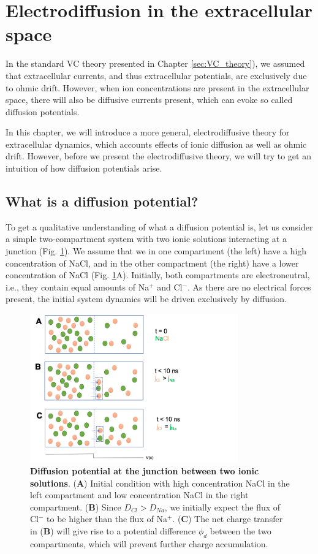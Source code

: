 \section{Electrodiffusion in the extracellular space}
\label{sec:eldiff}
In the standard VC theory presented in Chapter \ref{sec:VC_theory}), we assumed that extracellular currents, and thus extracellular potentials, are exclusively due to ohmic drift. However, when ion concentrations are present in the extracellular space, there will also be diffusive currents present, which can evoke so called diffusion potentials. 

In this chapter, we will introduce a more general, electrodiffusive theory for extracellular dynamics, which accounts effects of ionic diffusion as well as ohmic drift. However, before we present the electrodiffusive theory, we will try to get an intuition of how diffusion potentials arise.

\subsection{What is a diffusion potential?}
To get a qualitative understanding of what a diffusion potential is, let us consider a simple two-compartment system with two ionic solutions interacting at a junction  (Fig. \ref{fig:diffpot}). We assume that we in one compartment (the left) have a high concentration of NaCl, and in the other compartment (the right) have a lower concentration of NaCl (Fig. \ref{fig:diffpot}A). Initially, both compartments are electroneutral, i.e., they contain equal amounts of Na$^+$ and Cl$^-$. As there are no electrical forces present, the initial system dynamics will be driven exclusively by diffusion. 

\begin{figure}[!ht]
\begin{center}
\includegraphics[width=0.8\textwidth]{Figures/Diffusionpot.png}
\end{center}
\caption{\textbf{Diffusion potential at the junction between two ionic solutions}. ({\bf A}) Initial condition with high concentration NaCl in the left compartment and low concentration NaCl in the right compartment. ({\bf B}) Since $D_{Cl} > D_{Na}$, we initially expect the flux of Cl$^-$ to be higher than the flux of Na$^+$. ({\bf C}) The net charge transfer in ({\bf B}) will give rise to a potential difference $\phi_d$ between the two compartments, which will prevent further charge accumulation. }
\label{fig:diffpot}
\end{figure}

